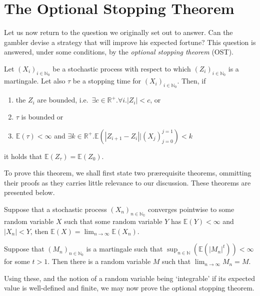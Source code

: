 \section{The Optional Stopping Theorem}
	Let us now return to the question we originally set out to answer. Can the gambler devise 
	a strategy that will improve his expected fortune? This question is answered, under some 
	conditions, by the \emph{optional stopping theorem} (OST).
	\begin{theorem}
		\label{theorem:ost}
		Let $(X_i)_{i\in\mathbb{N}_0}$ be a stochastic process with respect to which 
		$(Z_i)_{i\in\mathbb{N}_0}$ is a martingale. Let also $\tau$ be a stopping time for 
		$(X_i)_{i\in\mathbb{N}_0}$. Then, if
		\begin{enumerate}[(1)]
			\item the $Z_i$ are bounded, 
			i.e.\ $\exists c \in \mathbb{R}^+ . \forall i . |Z_i| < c$, or
			\item $\tau$ is bounded or
			\item $\mathbb{E}(\tau) < \infty$ and $\exists k \in \mathbb{R}^+ . 
			\mathbb{E}\left(|Z_{i+1}-Z_i| \big| (X_j)_{j=0}^{j=1}\right) < k$
		\end{enumerate}
		it holds that $\mathbb{E}(Z_\tau) = \mathbb{E}(Z_0)$.
	\end{theorem}
	To prove this theorem, we shall first state two pr{\ae}requisite theorems, ommitting 
	their proofs as they carries little relevance to our discussion. These theorems are 
	presented below.
	\begin{theorem}
		Suppose that a stochastic process $(X_n)_{n\in\mathbb{N_0}}$ converges pointwise to
		some random variable $X$ such that some random variable $Y$ has $\mathbb{E}(Y) <
		\infty$ and $|X_n| < Y$, then $\mathbb{E}(X) = \lim_{n\rightarrow \infty} 
		\mathbb{E}(X_n)$.
	\end{theorem}
	\begin{theorem}
		Suppose that $(M_n)_{n\in\mathbb{N}_0}$ is a martingale such that $\sup_{n\in
		\mathbb{N}}(\mathbb{E}(|M_n|^t)) < \infty$ for some $t>1$. Then there is a random 
		variable $M$ such that $\lim_{n\rightarrow \infty} M_n = M$. 
	\end{theorem}
	Using these, and the notion of a random variable being `integrable' if its expected value 
	is well-defined and finite, we may now prove the optional stopping theorem.
